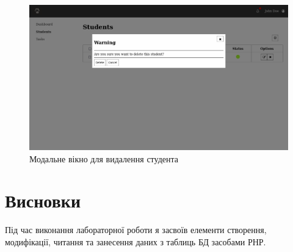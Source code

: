 \documentclass{article}
\begin{document}
\begin{normalsize}
\begin{figure}[H]
	\centering
	\includegraphics[scale=0.35]{7}
	\caption{Модальне вікно для видалення студента}
\end{figure}

\section*{Висновки}
Під час виконання лабораторної роботи я засвоїв елементи створення, модифікації, читання та занесення даних з
таблиць БД засобами РНР.
	    
\end{normalsize}
\end{document}
